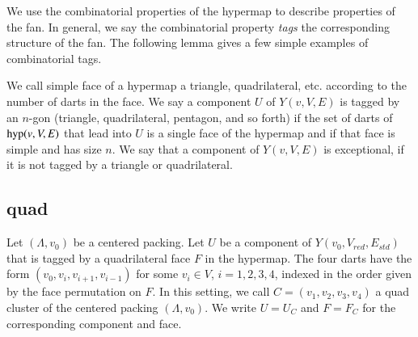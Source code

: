 We use the combinatorial properties of the hypermap to describe
properties of the fan.  In general, we say the combinatorial
property {\it tags} the corresponding structure of the fan.
The following lemma gives a few simple examples of combinatorial
tags.


\begin{definition} 
We call simple face of a hypermap a triangle, quadrilateral, etc.
according to the number of darts in the face.  
We say a component $U$ of $Y(v,V,E)$ is
tagged by an
$n$-gon (triangle, quadrilateral, pentagon, and so forth) if
the set of darts of ${\operatorname{hyp}}(v,V,E)$ that lead into $U$ is
a single face of the hypermap and if that face is simple and has
size $n$.   We say that
a component of $Y(v,V,E)$ is exceptional, if it is not tagged by a
triangle or quadrilateral.
\end{definition}





\subsection{quad}
\label{sec:quad-class}


\begin{definition}
Let $(\Lambda,v_0)$ be a centered packing.  Let $U$ be a 
component of $Y(v_0,V_{red},E_{std})$
that is tagged by a quadrilateral face $F$
in the hypermap.
The 
four darts have the form $(v_0,v_i,v_{i+1},v_{i-1})$ for some $v_i\in V$,
$i=1,2,3,4$,  indexed in the order given
by the face permutation on $F$.   In this setting, we call 
$C=(v_1,v_2,v_3,v_4)$ a quad cluster of the centered packing $(\Lambda,v_0)$.
We write
$U = U_C$ and $F= F_C$ for the corresponding component and face.
\end{definition}



